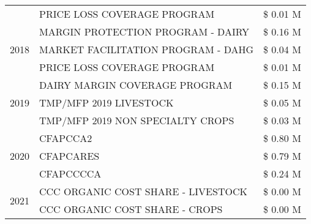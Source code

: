 \begin{tabular}{llr}
 & PRICE LOSS COVERAGE PROGRAM & \$ 0.01 M \\
\cline{1-3}
\multirow[t]{3}{*}{2018} & MARGIN PROTECTION PROGRAM - DAIRY & \$ 0.16 M \\
 & MARKET FACILITATION PROGRAM - DAHG & \$ 0.04 M \\
 & PRICE LOSS COVERAGE PROGRAM & \$ 0.01 M \\
\cline{1-3}
\multirow[t]{3}{*}{2019} & DAIRY MARGIN COVERAGE PROGRAM & \$ 0.15 M \\
 & TMP/MFP 2019 LIVESTOCK & \$ 0.05 M \\
 & TMP/MFP 2019 NON SPECIALTY CROPS & \$ 0.03 M \\
\cline{1-3}
\multirow[t]{3}{*}{2020} & CFAPCCA2 & \$ 0.80 M \\
 & CFAPCARES & \$ 0.79 M \\
 & CFAPCCCCA & \$ 0.24 M \\
\cline{1-3}
\multirow[t]{2}{*}{2021} & CCC ORGANIC COST SHARE - LIVESTOCK & \$ 0.00 M \\
 & CCC ORGANIC COST SHARE - CROPS & \$ 0.00 M \\
\cline{1-3}
\bottomrule
\end{tabular}
